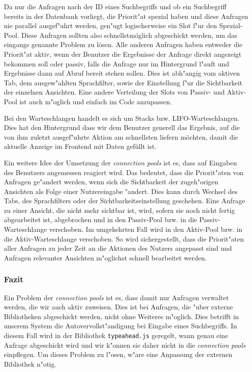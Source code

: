 Da nur die Anfragen nach der ID eines Suchbegriffs und ob ein Suchbegriff bereits in der Datenbank vorliegt, die Priorit"at spezial haben und diese Anfragen nie parallel ausgef"uhrt werden, gen"ugt logischerweise ein Slot f"ur den Spezial-Pool. Diese Anfragen sollten also schnellstmöglich abgeschickt werden, um das eingangs genannte Problem zu lösen. Alle anderen Anfragen haben entweder die Priorit"at aktiv, wenn der Benutzer die Ergebnisse der Anfrage direkt angezeigt bekommen soll oder passiv, falls die Anfrage nur im Hintergrund l"auft und Ergebnisse dann auf Abruf bereit stehen sollen. Dies ist abh"angig vom aktiven Tab, dem ausgew"ahlten Sprachfilter, sowie der Einstellung f"ur die Sichtbarkeit der einzelnen Ansichten.
Eine andere Verteilung der Slots von Passiv- und Aktiv-Pool ist auch m"oglich und einfach im Code anzupassen.

Bei den Warteschlangen handelt es sich um Stacks bzw. LIFO-Warteschlangen. Dies hat den Hintergrund dass wir dem Benutzer generell das Ergebnis, auf die von ihm zuletzt ausgef"uhrte Aktion am schnellsten liefern möchten, damit die aktuelle Anzeige im Frontend mit Daten gefüllt ist.

Ein weitere Idee der Umsetzung der \textit{connection pools} ist es, dass auf Eingaben des Benutzers angemessen reagiert wird. Das bedeutet, dass die Priorit"aten von Anfragen ge"andert werden, wenn sich die Sichtbarkeit der zugeh"origen Ansichten als Folge einer Nutzereingabe "andert. Dies kann durch Wechsel des Tabs, des Sprachfilters oder der Sichtbarkeitseinstellung geschehen. Eine Anfrage zu einer Ansicht, die nicht mehr sichtbar ist, wird, sofern sie noch nicht fertig abgearbeitet ist, abgebrochen und in den Passiv-Pool bzw. in die Passiv-Warteschlange verschoben. Im umgekehrten Fall wird in den Aktiv-Pool bzw. in die Aktiv-Warteschlange verschoben.
So wird sichergestellt, dass die Priorit"aten aller Anfragen zu jeder Zeit an die Aktionen des Nutzers angepasst sind und Anfragen relevanter Ansichten m"oglichst schnell bearbeitet werden.

\subsubsection{Fazit}
Ein Problem der \textit{connection pools} ist es, dass damit nur Anfragen verwaltet werden, die wir auch aktiv zuweisen. Dies ist bei Anfragen, die "uber externe Bibliotheken abgeschickt werden, nicht ohne Weiteres m"oglich. Dies betrifft in unserem System die Autovervollst"andigung bei Eingabe eines Suchbegriffs. In diesem Fall wird in der Bibliothek \texttt{typeahead.js} \cite{typeahead}
geregelt, wann genau eine Anfrage abgeschickt wird und wir k"onnen sie daher nicht in die \textit{connection pools} einpflegen. Um dieses Problem zu l"osen, w"are eine Anpassung der externen Bibliothek n"otig.

